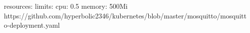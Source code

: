 
        resources:
          limits:
            cpu: 0.5
            memory: 500Mi
            https://github.com/hyperbolic2346/kubernetes/blob/master/mosquitto/mosquitto-deployment.yaml